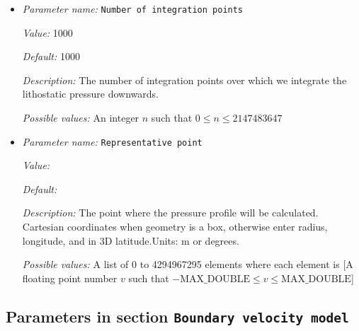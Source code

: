 \begin{itemize}
\item {\it Parameter name:} {\tt Number of integration points}
\label{parameters:Boundary traction model/Initial lithostatic pressure/Number of integration points}
\label{parameters:Boundary_20traction_20model/Initial_20lithostatic_20pressure/Number_20of_20integration_20points}


{\it Value:} 1000


{\it Default:} 1000


{\it Description:} The number of integration points over which we integrate the lithostatic pressure downwards. 


{\it Possible values:} An integer $n$ such that $0\leq n \leq 2147483647$
\item {\it Parameter name:} {\tt Representative point}
\label{parameters:Boundary traction model/Initial lithostatic pressure/Representative point}
\label{parameters:Boundary_20traction_20model/Initial_20lithostatic_20pressure/Representative_20point}


{\it Value:} 


{\it Default:} 


{\it Description:} The point where the pressure profile will be calculated. Cartesian coordinates when geometry is a box, otherwise enter radius, longitude, and in 3D latitude.Units: m or degrees.


{\it Possible values:} A list of 0 to 4294967295 elements where each element is [A floating point number $v$ such that $-\text{MAX\_DOUBLE} \leq v \leq \text{MAX\_DOUBLE}$]
\end{itemize}

\subsection{Parameters in section \tt Boundary velocity model}
\label{parameters:Boundary_20velocity_20model}

